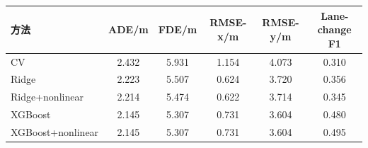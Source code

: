 \begin{tabular}{lccccc}
\toprule
方法 & ADE/m & FDE/m & RMSE-x/m & RMSE-y/m & Lane-change F1 \\ 
\midrule
CV & 2.432 & 5.931 & 1.154 & 4.073 & 0.310 \\ 
Ridge & 2.223 & 5.507 & 0.624 & 3.720 & 0.356 \\ 
Ridge+nonlinear & 2.214 & 5.474 & 0.622 & 3.714 & 0.345 \\ 
XGBoost & 2.145 & 5.307 & 0.731 & 3.604 & 0.480 \\ 
XGBoost+nonlinear & 2.145 & 5.307 & 0.731 & 3.604 & 0.495 \\ 
\bottomrule
\end{tabular}
